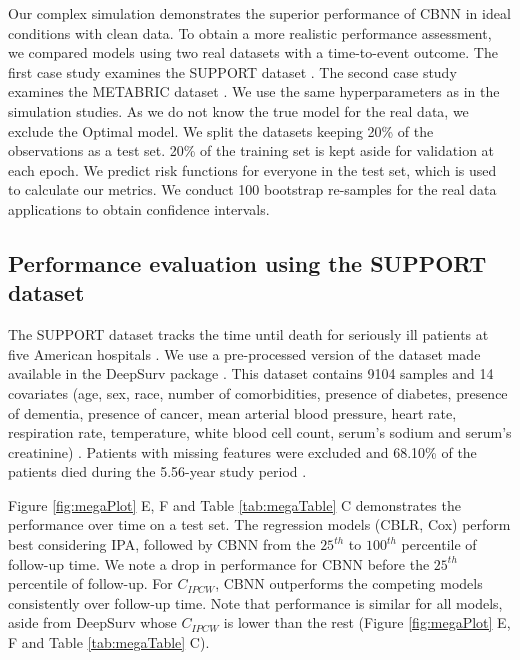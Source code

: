 \documentclass[AMA,STIX1COL,]{WileyNJD-v2}
\begin{document}
Our complex simulation demonstrates the superior performance of CBNN in
ideal conditions with clean data. To obtain a more realistic performance
assessment, we compared models using two real datasets with a
time-to-event outcome. The first case study examines the SUPPORT dataset
\citep{knaus1995SUPPORT}. The second case study examines the METABRIC
dataset \citep{curtis2012genomic}. We use the same hyperparameters as in
the simulation studies. As we do not know the true model for the real
data, we exclude the Optimal model. We split the datasets keeping 20\%
of the observations as a test set. 20\% of the training set is kept
aside for validation at each epoch. We predict risk functions for
everyone in the test set, which is used to calculate our metrics. We
conduct 100 bootstrap re-samples for the real data applications to
obtain confidence intervals.

\hypertarget{performance-evaluation-using-the-support-dataset}{%
\subsection{Performance evaluation using the SUPPORT
dataset}\label{performance-evaluation-using-the-support-dataset}}

The SUPPORT dataset tracks the time until death for seriously ill
patients at five American hospitals \citep{knaus1995SUPPORT}. We use a
pre-processed version of the dataset made available in the DeepSurv
package \citep{katzman2018DeepSurv}. This dataset contains 9104 samples
and 14 covariates (age, sex, race, number of comorbidities, presence of
diabetes, presence of dementia, presence of cancer, mean arterial blood
pressure, heart rate, respiration rate, temperature, white blood cell
count, serum's sodium and serum's creatinine)
\citep{katzman2018DeepSurv}. Patients with missing features were
excluded and 68.10\% of the patients died during the 5.56-year study
period \citep{katzman2018DeepSurv}.

Figure \ref{fig:megaPlot} E, F and Table \ref{tab:megaTable} C
demonstrates the performance over time on a test set. The regression
models (CBLR, Cox) perform best considering IPA, followed by CBNN from
the \(25^{th}\) to \(100^{th}\) percentile of follow-up time. We note a
drop in performance for CBNN before the \(25^{th}\) percentile of
follow-up. For \(C_{IPCW}\), CBNN outperforms the competing models
consistently over follow-up time. Note that performance is similar for
all models, aside from DeepSurv whose \(C_{IPCW}\) is lower than the
rest (Figure \ref{fig:megaPlot} E, F and Table \ref{tab:megaTable} C).
\end{document}
